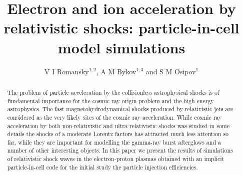\documentclass[a4paper]{jpconf}
\begin{document}
\title{Electron and ion acceleration by relativistic shocks: particle-in-cell model simulations}

\author{V I Romansky$^{1,2}$, A M Bykov$^{1,3}$ and S M Osipov$^1$}

\address{$^1$ Ioffe Institute, 26 Politekhnicheskaya st., St. Petersburg 194021, Russia}
\address{$^2$
	Sternberg Astronomical Institute, Moscow State University
	Universitetsky pr., 13, Moscow 119234, Russia}
\address{$^3$ Peter the Great St.~Petersburg Polytechnic University, 29 Politekhnicheskaya st., St. Petersburg 195251, Russia}


\begin{abstract}
	The problem of particle acceleration by the collisionless astrophysical shocks is of fundamental importance for the cosmic ray origin problem and the high energy astrophysics. The fast magnetohydrodynamical shocks produced by relativistic jets are considered as the very likely sites of the cosmic ray acceleration.
	While cosmic ray acceleration by both non-relativistic and ultra relativistic shocks was studied in some details the shocks of a moderate Lorentz factors has attracted much less attention so far, while they are important for modelling the gamma-ray burst afterglows and a number of other interesting objects. In this paper we present the results of simulations of relativistic shock waves in the electron-proton plasmas obtained with an implicit particle-in-cell code for the initial study the particle injection efficiencies.
\end{abstract}




\end{document}
